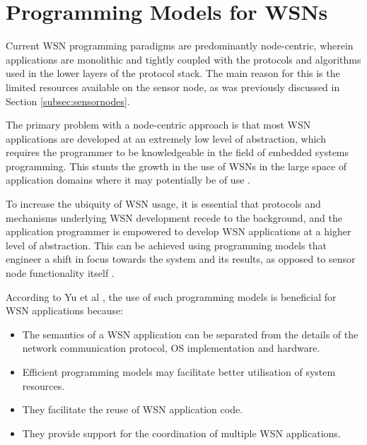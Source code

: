 
\section {Programming Models for WSNs}

Current WSN programming paradigms are predominantly node-centric, wherein
applications are monolithic and tightly coupled with the protocols and algorithms
used in the lower layers of the protocol stack. 
The main reason for this is the limited resources available on the sensor node, as
was previously discussed in Section \ref{subsec:sensornodes}.

The primary problem with a node-centric approach is that most WSN applications
are developed at an extremely low level of abstraction, which requires the programmer to be knowledgeable in the field of
embedded systems programming. This stunts the growth in the use of WSNs in the
large space of application domains where it may potentially be of use
\cite{mottola_middleware:2008}. 

To increase the ubiquity of WSN
usage, it is essential that protocols and mechanisms underlying WSN
development recede to the background, and the application programmer is
empowered to develop WSN applications at a higher level of abstraction. This
can be achieved using programming models that engineer a shift in focus
towards the system and its results, as opposed to sensor node functionality
itself \cite{mottola_middleware:2008}. 

According to Yu et al \cite{yu_issuesMiddleware:2004}, the use of such
programming models is beneficial for WSN applications because:
\begin{itemize}
\item The semantics of a WSN application can be separated from the details of 
the network communication protocol, OS implementation and hardware.
\item Efficient programming models may facilitate better utilisation of system 
resources.
\item They facilitate the reuse of WSN application code.
\item They provide support for the coordination of multiple WSN applications.
\end{itemize}

